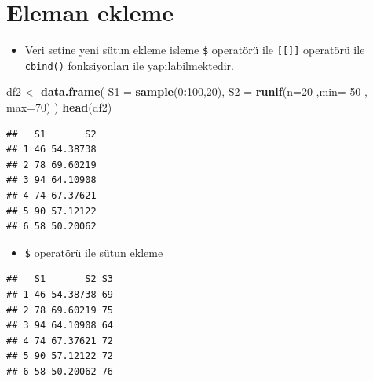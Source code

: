 \documentclass[
  oneside]{book}
\newenvironment{Shaded}{\begin{snugshade}}{\end{snugshade}}
\newcommand{\AttributeTok}[1]{\textcolor[rgb]{0.13,0.29,0.53}{#1}}
\newcommand{\ConstantTok}[1]{\textcolor[rgb]{0.56,0.35,0.01}{#1}}
\newcommand{\DecValTok}[1]{\textcolor[rgb]{0.00,0.00,0.81}{#1}}
\newcommand{\FunctionTok}[1]{\textcolor[rgb]{0.13,0.29,0.53}{\textbf{#1}}}
\newcommand{\NormalTok}[1]{#1}
\newcommand{\OtherTok}[1]{\textcolor[rgb]{0.56,0.35,0.01}{#1}}
\newcommand{\SpecialCharTok}[1]{\textcolor[rgb]{0.81,0.36,0.00}{\textbf{#1}}}
\providecommand{\tightlist}{%
  \setlength{\itemsep}{0pt}\setlength{\parskip}{0pt}}
\begin{document}
\hypertarget{eleman-ekleme}{%
\section{Eleman ekleme}\label{eleman-ekleme}}

\begin{itemize}
\tightlist
\item
  Veri setine yeni sütun ekleme isleme \texttt{\$} operatörü ile \texttt{{[}{[}{]}{]}} operatörü ile \texttt{cbind()} fonksiyonları ile yapılabilmektedir.
\end{itemize}

\begin{Shaded}
\begin{Highlighting}[]
\NormalTok{df2 }\OtherTok{\textless{}{-}} \FunctionTok{data.frame}\NormalTok{(}
      \AttributeTok{S1 =} \FunctionTok{sample}\NormalTok{(}\DecValTok{0}\SpecialCharTok{:}\DecValTok{100}\NormalTok{,}\DecValTok{20}\NormalTok{),}
      \AttributeTok{S2 =} \FunctionTok{runif}\NormalTok{(}\AttributeTok{n=}\DecValTok{20}\NormalTok{ ,}\AttributeTok{min=} \DecValTok{50}\NormalTok{ , }\AttributeTok{max=}\DecValTok{70}\NormalTok{)}
\NormalTok{)}
\FunctionTok{head}\NormalTok{(df2)}
\end{Highlighting}
\end{Shaded}

\begin{verbatim}
##   S1       S2
## 1 46 54.38738
## 2 78 69.60219
## 3 94 64.10908
## 4 74 67.37621
## 5 90 57.12122
## 6 58 50.20062
\end{verbatim}

\begin{itemize}
\tightlist
\item
  \texttt{\$} operatörü ile sütun ekleme
\end{itemize}

\begin{Shaded}
\end{Shaded}

\begin{verbatim}
##   S1       S2 S3
## 1 46 54.38738 69
## 2 78 69.60219 75
## 3 94 64.10908 64
## 4 74 67.37621 72
## 5 90 57.12122 72
## 6 58 50.20062 76
\end{verbatim}
\end{document}
